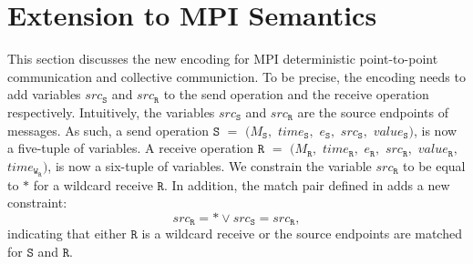 \section{Extension to MPI Semantics}
This section discusses the new encoding for MPI deterministic point-to-point communication and collective communiction. To be precise, the encoding needs to add variables  $src_\mathtt{S}$ and $src_\mathtt{R}$ to the send operation and the receive operation respectively. Intuitively, the variables $src_\mathtt{S}$ and $src_\mathtt{R}$ are the source endpoints of messages. As such, a send operation $\mathtt{S}$ $=$ $(M_\mathtt{S},$ $\mathit{time}_\mathtt{S},$ $e_\mathtt{S},$ $src_\mathtt{S},$ $\mathit{value}_\mathtt{S})$,  is now a five-tuple of variables. A receive operation $\mathtt{R}$ $=$ $(M_\mathtt{R},$ $\mathit{time}_\mathtt{R},$ $e_\mathtt{R},$ $src_\mathtt{R},$ $\mathit{value}_\mathtt{R},$ $\mathit{time}_{\mathtt{W}_\mathtt{R}})$, is now a six-tuple of variables. We constrain the variable $src_\mathtt{R}$ to be equal to $\ast$ for a wildcard receive $\mathtt{R}$. In addition, the match pair defined in  adds a new constraint: 
\[
src_\mathtt{R} = \ast \vee src_\mathtt{S} = src_\mathtt{R}, 
\]
indicating that either $\mathtt{R}$ is a wildcard receive or the source endpoints are matched for $\mathtt{S}$ and $\mathtt{R}$.